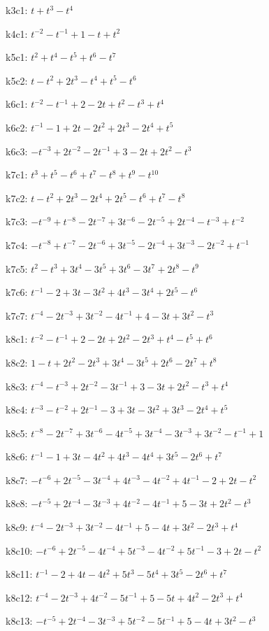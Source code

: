 k3c1: $t+t^{3}-t^{4}$

k4c1: $t^{-2}-t^{-1}+1-t+t^{2}$

k5c1: $t^{2}+t^{4}-t^{5}+t^{6}-t^{7}$

k5c2: $t-t^{2}+2t^{3}-t^{4}+t^{5}-t^{6}$

k6c1: $t^{-2}-t^{-1}+2-2t+t^{2}-t^{3}+t^{4}$

k6c2: $t^{-1}-1+2t-2t^{2}+2t^{3}-2t^{4}+t^{5}$

k6c3: $-t^{-3}+2t^{-2}-2t^{-1}+3-2t+2t^{2}-t^{3}$

k7c1: $t^{3}+t^{5}-t^{6}+t^{7}-t^{8}+t^{9}-t^{10}$

k7c2: $t-t^{2}+2t^{3}-2t^{4}+2t^{5}-t^{6}+t^{7}-t^{8}$

k7c3: $-t^{-9}+t^{-8}-2t^{-7}+3t^{-6}-2t^{-5}+2t^{-4}-t^{-3}+t^{-2}$

k7c4: $-t^{-8}+t^{-7}-2t^{-6}+3t^{-5}-2t^{-4}+3t^{-3}-2t^{-2}+t^{-1}$

k7c5: $t^{2}-t^{3}+3t^{4}-3t^{5}+3t^{6}-3t^{7}+2t^{8}-t^{9}$

k7c6: $t^{-1}-2+3t-3t^{2}+4t^{3}-3t^{4}+2t^{5}-t^{6}$

k7c7: $t^{-4}-2t^{-3}+3t^{-2}-4t^{-1}+4-3t+3t^{2}-t^{3}$

k8c1: $t^{-2}-t^{-1}+2-2t+2t^{2}-2t^{3}+t^{4}-t^{5}+t^{6}$

k8c2: $1-t+2t^{2}-2t^{3}+3t^{4}-3t^{5}+2t^{6}-2t^{7}+t^{8}$

k8c3: $t^{-4}-t^{-3}+2t^{-2}-3t^{-1}+3-3t+2t^{2}-t^{3}+t^{4}$

k8c4: $t^{-3}-t^{-2}+2t^{-1}-3+3t-3t^{2}+3t^{3}-2t^{4}+t^{5}$

k8c5: $t^{-8}-2t^{-7}+3t^{-6}-4t^{-5}+3t^{-4}-3t^{-3}+3t^{-2}-t^{-1}+1$

k8c6: $t^{-1}-1+3t-4t^{2}+4t^{3}-4t^{4}+3t^{5}-2t^{6}+t^{7}$

k8c7: $-t^{-6}+2t^{-5}-3t^{-4}+4t^{-3}-4t^{-2}+4t^{-1}-2+2t-t^{2}$

k8c8: $-t^{-5}+2t^{-4}-3t^{-3}+4t^{-2}-4t^{-1}+5-3t+2t^{2}-t^{3}$

k8c9: $t^{-4}-2t^{-3}+3t^{-2}-4t^{-1}+5-4t+3t^{2}-2t^{3}+t^{4}$

k8c10: $-t^{-6}+2t^{-5}-4t^{-4}+5t^{-3}-4t^{-2}+5t^{-1}-3+2t-t^{2}$

k8c11: $t^{-1}-2+4t-4t^{2}+5t^{3}-5t^{4}+3t^{5}-2t^{6}+t^{7}$

k8c12: $t^{-4}-2t^{-3}+4t^{-2}-5t^{-1}+5-5t+4t^{2}-2t^{3}+t^{4}$

k8c13: $-t^{-5}+2t^{-4}-3t^{-3}+5t^{-2}-5t^{-1}+5-4t+3t^{2}-t^{3}$

